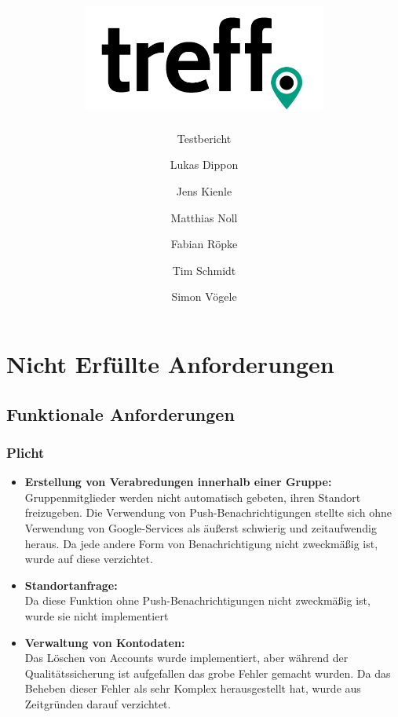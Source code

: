 \documentclass[parskip=full,11pt]{scrartcl}
\title{\includegraphics[width = 80mm]{images/logo_crop.png}}
\subtitle{\huge Testbericht}
\author{Lukas Dippon
        \and Jens Kienle
        \and Matthias Noll
        \and Fabian Röpke
        \and Tim Schmidt
        \and Simon Vögele}
\begin{document}
\maketitle
\thispagestyle{empty} %

\pagebreak
\tableofcontents

\pagebreak
\section{Nicht Erfüllte Anforderungen}
	\subsection{Funktionale Anforderungen}
		\subsubsection{Plicht}
			\begin{itemize}
                \item \textbf{Erstellung von Verabredungen innerhalb einer Gruppe:}\\
							\label{notification}Gruppenmitglieder werden nicht
                            automatisch gebeten, ihren Standort freizugeben.
                            Die Verwendung von Push-Benachrichtigungen stellte
                            sich ohne Verwendung von Google-Services als
                            äußerst schwierig und zeitaufwendig heraus. Da jede
                            andere Form von Benachrichtigung nicht zweckmäßig
                            ist, wurde auf diese verzichtet.
                \item \textbf{Standortanfrage:}\\
							\label{requestPosition}Da diese Funktion ohne
							Push-Benachrichtigungen nicht zweckmäßig ist,
							wurde sie nicht implementiert
                \item \textbf{Verwaltung von Kontodaten:}\\
                            \label{deleteaccount}Das Löschen von Accounts wurde
                            implementiert, aber während der Qualitätssicherung
                            ist aufgefallen das grobe Fehler gemacht wurden.
                            Da das Beheben dieser Fehler als sehr Komplex
                            herausgestellt hat, wurde aus Zeitgründen darauf
                            verzichtet.
			\end{itemize}
\end{document}
